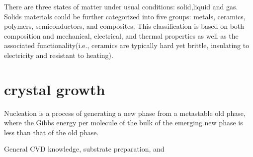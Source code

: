 There are three states of matter under usual conditions: solid,liquid and gas. Solids materials could be further categorized into five groups: metals, ceramics, polymers, semiconductors, and composites.\cite{William2009} This classification is based on both composition and mechanical, electrical, and thermal properties as well as the associated functionality(i.e., \gls{ceramics} are typically hard yet brittle, insulating to electricity and resistant to heating).

\fi

\iffalse

We have synthesized \gls{tmo} and \gls{tmdc} at nanoscale, measured their crystalline structures and optical properties and demonstrated some devices assembled using as-synthesized nanomaterials. We aim to illustrate that by nanoengineering these \gls{tmo} and \gls{tmdc}, enhanced performances over their bulk states could be expected and new properties will arise. In the remaining sections of this chapter, we will discuss some general perspectives of nanomaterials, the growth apparatus and characterization methods that apply to all experiments done in this work. Then chapter 2 will focus on growth of \ce{WO3} and its derivative. We employed thermal \gls{cvd} to synthesize \ce{WO3} \gls{nw}, and we investigated the role of impurity in tungsten metallic powders, during which we observed a new state of sodium tungsten oxides: \ce{Na5W14O44} nanowires. We also found a method to potentially obtain large yield of \ce{WO3} \gls{nw}. Chapter 3 will concentrate on \ce{MoO3}. We explored two different growth mechanism of \ce{MoO3}:\gls{vs} and \gls{vls}. We discovered that alkaline oxides can be used as catalyst to grow two distinct \ce{MoO3} morphologies: nanobelts and towers. We further demonstrated the application of as-synthesized \ce{MoO3} nanomaterials in electrochromic devices.  In chapter 4 we discuss  We synthesized  and inspected the growth of \gls{fl} \ce{WS2}. Chapter 5 will conclude with an overall summary.

\fi
\section{crystal growth}

Nucleation is a process of generating a new phase from a metastable old phase, where the Gibbs energy per molecule of the bulk of the emerging new phase is less than that of the old phase.

General CVD knowledge, substrate preparation, and\cite{MichealK.Zuraw2003}

